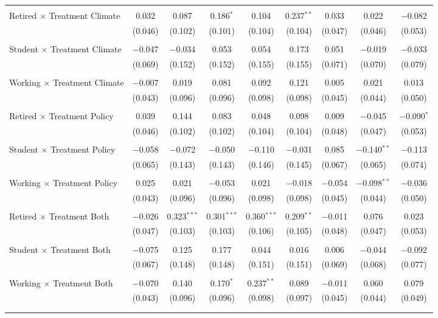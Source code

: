 \begin{tabular}{@{\extracolsep{5pt}}lcccccccc}
  & & & & & & & & \\ 
 Retired $\times$ Treatment Climate & 0.032 & 0.087 & 0.186$^{*}$ & 0.104 & 0.237$^{**}$ & 0.033 & 0.022 & $-$0.082 \\ 
  & (0.046) & (0.102) & (0.101) & (0.104) & (0.104) & (0.047) & (0.046) & (0.053) \\ 
  & & & & & & & & \\ 
 Student $\times$ Treatment Climate & $-$0.047 & $-$0.034 & 0.053 & 0.054 & 0.173 & 0.051 & $-$0.019 & $-$0.033 \\ 
  & (0.069) & (0.152) & (0.152) & (0.155) & (0.155) & (0.071) & (0.070) & (0.079) \\ 
  & & & & & & & & \\ 
 Working $\times$ Treatment Climate & $-$0.007 & 0.019 & 0.081 & 0.092 & 0.121 & 0.005 & 0.021 & 0.013 \\ 
  & (0.043) & (0.096) & (0.096) & (0.098) & (0.098) & (0.045) & (0.044) & (0.050) \\ 
  & & & & & & & & \\ 
 Retired $\times$ Treatment Policy & 0.039 & 0.144 & 0.083 & 0.048 & 0.098 & 0.009 & $-$0.045 & $-$0.090$^{*}$ \\ 
  & (0.046) & (0.102) & (0.102) & (0.104) & (0.104) & (0.048) & (0.047) & (0.053) \\ 
  & & & & & & & & \\ 
 Student $\times$ Treatment Policy & $-$0.058 & $-$0.072 & $-$0.050 & $-$0.110 & $-$0.031 & 0.085 & $-$0.140$^{**}$ & $-$0.113 \\ 
  & (0.065) & (0.143) & (0.143) & (0.146) & (0.145) & (0.067) & (0.065) & (0.074) \\ 
  & & & & & & & & \\ 
 Working $\times$ Treatment Policy & 0.025 & 0.021 & $-$0.053 & 0.021 & $-$0.018 & $-$0.054 & $-$0.098$^{**}$ & $-$0.036 \\ 
  & (0.043) & (0.096) & (0.096) & (0.098) & (0.098) & (0.045) & (0.044) & (0.050) \\ 
  & & & & & & & & \\ 
 Retired $\times$ Treatment Both & $-$0.026 & 0.323$^{***}$ & 0.301$^{***}$ & 0.360$^{***}$ & 0.209$^{**}$ & $-$0.011 & 0.076 & 0.023 \\ 
  & (0.047) & (0.103) & (0.103) & (0.106) & (0.105) & (0.048) & (0.047) & (0.053) \\ 
  & & & & & & & & \\ 
 Student $\times$ Treatment Both & $-$0.075 & 0.125 & 0.177 & 0.044 & 0.016 & 0.006 & $-$0.044 & $-$0.092 \\ 
  & (0.067) & (0.148) & (0.148) & (0.151) & (0.151) & (0.069) & (0.068) & (0.077) \\ 
  & & & & & & & & \\ 
 Working $\times$ Treatment Both & $-$0.070 & 0.140 & 0.170$^{*}$ & 0.237$^{**}$ & 0.089 & $-$0.011 & 0.060 & 0.079 \\ 
  & (0.043) & (0.096) & (0.096) & (0.098) & (0.097) & (0.045) & (0.044) & (0.049) \\ 
  & & & & & & & & \\ 
\hline \\[-1.8ex] 


\end{tabular}
